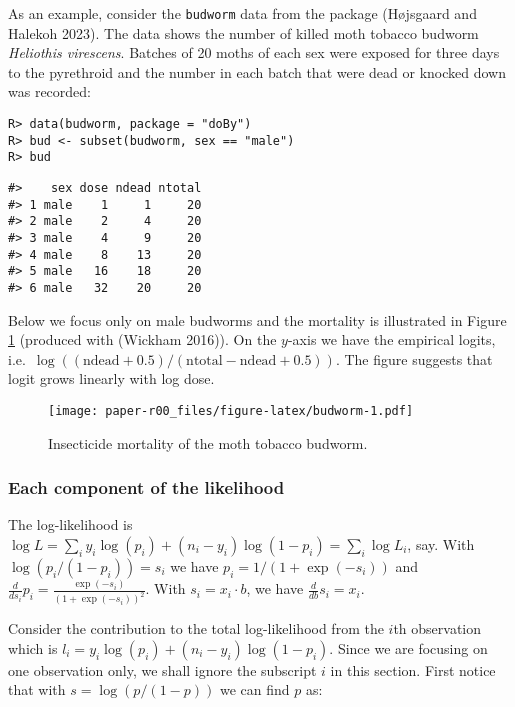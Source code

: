 As an example, consider the \texttt{budworm} data from the  package (Højsgaard and Halekoh 2023).
The data shows the number of killed moth tobacco budworm
\emph{Heliothis virescens}. Batches of 20 moths of each sex were
exposed for three days to the pyrethroid and the number in each batch
that were dead or knocked down was recorded:

\begin{verbatim}
R> data(budworm, package = "doBy")
R> bud <- subset(budworm, sex == "male")
R> bud
\end{verbatim}

\begin{verbatim}
#>    sex dose ndead ntotal
#> 1 male    1     1     20
#> 2 male    2     4     20
#> 3 male    4     9     20
#> 4 male    8    13     20
#> 5 male   16    18     20
#> 6 male   32    20     20
\end{verbatim}

Below we focus only on male budworms and the mortality is illustrated
in Figure \ref{fig:budworm} (produced with  (Wickham 2016)). On the \(y\)-axis we have the empirical
logits, i.e.~\(\log((\text{ndead} + 0.5)/(\text{ntotal}-\text{ndead} + 0.5))\). The figure suggests that logit grows linearly with log dose.

\begin{figure}
\centering
\texttt{[image: paper-r00\_files/figure-latex/budworm-1.pdf]}
\caption{\label{fig:budworm}Insecticide mortality of the moth tobacco budworm.}
\end{figure}

\hypertarget{each-component-of-the-likelihood}{%
\subsubsection{Each component of the likelihood}\label{each-component-of-the-likelihood}}

The log-likelihood is \(\log L=\sum_i y_i \log(p_i) + (n_i-y_i) \log(1-p_i) = \sum_i \log L_i\), say. With \(\log(p_i/(1-p_i)) = s_i\) we
have \(p_i=1 / (1+ \exp(-s_i))\) and \(\frac d {ds_i} p_i = \frac{\exp(- s_i)}{\left(1 + \exp(- s_i)\right)^{2}}\). With \(s_i = x_i\cdot b\), we
have \(\frac d {db} s_i = x_i\).

Consider the contribution to the total log-likelihood from the \(i\)th
observation which is \(l_i = y_i \log(p_i) + (n_i-y_i) \log(1-p_i)\).
Since we are focusing on one observation only, we shall ignore the
subscript \(i\) in this section. First notice that with
\(s = \log(p/(1-p))\) we can find \(p\) as:

